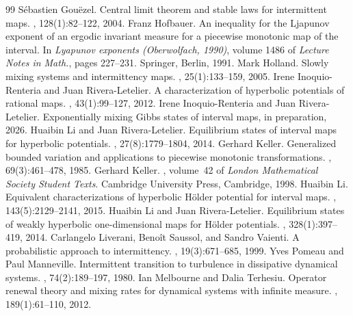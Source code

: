 \documentclass[10pt,a4paper]{amsart}
\numberwithin{equation}{section} %
\numberwithin{figure}{section} %
\renewcommand{\=}{\coloneqq}
\begin{document}
\begin{thebibliography}{99}
 S\'ebastien Gou\"ezel. \newblock Central limit theorem and stable laws for intermittent maps. , 128(1):82--122, 2004.
 Franz Hofbauer. \newblock An inequality for the {L}japunov exponent of an ergodic invariant measure for a piecewise monotonic map of the interval. \newblock In {\em Lyapunov exponents ({O}berwolfach, 1990)}, volume 1486 of {\em Lecture Notes in Math.}, pages 227--231. Springer, Berlin, 1991.
 Mark Holland. \newblock Slowly mixing systems and intermittency maps. , 25(1):133--159, 2005.
 Irene Inoquio-Renteria and Juan Rivera-Letelier. \newblock A characterization of hyperbolic potentials of rational maps. , 43(1):99--127, 2012.
 Irene Inoquio-Renteria and Juan Rivera-Letelier. \newblock Exponentially mixing {Gibbs} states of interval maps, in preparation, 2026.
 Huaibin Li and Juan Rivera-Letelier. \newblock Equilibrium states of interval maps for hyperbolic potentials. , 27(8):1779--1804, 2014.
 Gerhard Keller. \newblock Generalized bounded variation and applications to piecewise monotonic transformations. , 69(3):461--478, 1985.
 Gerhard Keller. , volume~42 of {\em London Mathematical Society Student Texts}. \newblock Cambridge University Press, Cambridge, 1998.
 Huaibin Li. \newblock Equivalent characterizations of hyperbolic {H}\"older potential for interval maps. , 143(5):2129--2141, 2015.
 Huaibin Li and Juan Rivera-Letelier. \newblock Equilibrium states of weakly hyperbolic one-dimensional maps for {H}\"older potentials. , 328(1):397--419, 2014.
 Carlangelo Liverani, Beno\^it Saussol, and Sandro Vaienti. \newblock A probabilistic approach to intermittency. , 19(3):671--685, 1999.
 Yves Pomeau and Paul Manneville. \newblock Intermittent transition to turbulence in dissipative dynamical systems. , 74(2):189--197, 1980.
 Ian Melbourne and Dalia Terhesiu. \newblock Operator renewal theory and mixing rates for dynamical systems with infinite measure. , 189(1):61--110, 2012.

\end{thebibliography}
\end{document}
